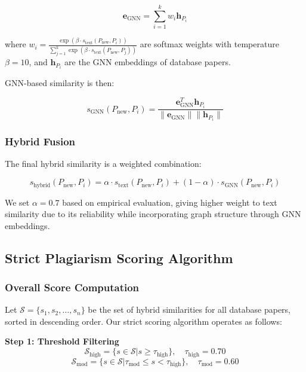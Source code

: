 \documentclass[conference]{IEEEtran}
\begin{document}
\begin{equation}
\mathbf{e}_{\text{GNN}} = \sum_{i=1}^{k} w_i \mathbf{h}_{P_i}
\end{equation}

where $w_i = \frac{\exp(\beta \cdot s_{\text{text}}(P_{\text{new}}, P_i))}{\sum_{j=1}^{k} \exp(\beta \cdot s_{\text{text}}(P_{\text{new}}, P_j))}$ are softmax weights with temperature $\beta = 10$, and $\mathbf{h}_{P_i}$ are the GNN embeddings of database papers.

GNN-based similarity is then:

\begin{equation}
s_{\text{GNN}}(P_{\text{new}}, P_i) = \frac{\mathbf{e}_{\text{GNN}}^T \mathbf{h}_{P_i}}{\|\mathbf{e}_{\text{GNN}}\| \|\mathbf{h}_{P_i}\|}
\end{equation}

\subsubsection{Hybrid Fusion}
The final hybrid similarity is a weighted combination:

\begin{equation}
s_{\text{hybrid}}(P_{\text{new}}, P_i) = \alpha \cdot s_{\text{text}}(P_{\text{new}}, P_i) + (1-\alpha) \cdot s_{\text{GNN}}(P_{\text{new}}, P_i)
\end{equation}

We set $\alpha = 0.7$ based on empirical evaluation, giving higher weight to text similarity due to its reliability while incorporating graph structure through GNN embeddings.

\subsection{Strict Plagiarism Scoring Algorithm}

\subsubsection{Overall Score Computation}
Let $\mathcal{S} = \{s_1, s_2, \ldots, s_n\}$ be the set of hybrid similarities for all database papers, sorted in descending order. Our strict scoring algorithm operates as follows:

\textbf{Step 1: Threshold Filtering}
\begin{equation}
\mathcal{S}_{\text{high}} = \{s \in \mathcal{S} | s \geq \tau_{\text{high}}\}, \quad \tau_{\text{high}} = 0.70
\end{equation}
\begin{equation}
\mathcal{S}_{\text{mod}} = \{s \in \mathcal{S} | \tau_{\text{mod}} \leq s < \tau_{\text{high}}\}, \quad \tau_{\text{mod}} = 0.60
\end{equation}
\end{document}
